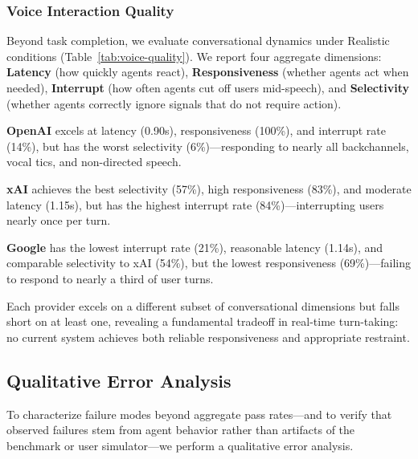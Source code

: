 \subsubsection{Voice Interaction Quality}

Beyond task completion, we evaluate conversational dynamics under Realistic conditions (Table~\ref{tab:voice-quality}). We report four aggregate dimensions: \textbf{Latency} (how quickly agents react), \textbf{Responsiveness} (whether agents act when needed), \textbf{Interrupt} (how often agents cut off users mid-speech), and \textbf{Selectivity} (whether agents correctly ignore signals that do not require action).

\begin{table}[h]
\caption{Voice interaction quality (Realistic condition, aggregated across domains). \textbf{Bold} indicates best. Full breakdown in Appendix~\ref{app:voice-metrics-detail}.}
\label{tab:voice-quality}
\centering
\begin{small}
\resizebox{\columnwidth}{!}{%

}
\end{small}
\end{table}



\textbf{OpenAI} excels at latency (0.90s), responsiveness (100\%), and interrupt rate (14\%), but has the worst selectivity (6\%)---responding to nearly all backchannels, vocal tics, and non-directed speech.

\textbf{xAI} achieves the best selectivity (57\%), high responsiveness (83\%), and moderate latency (1.15s), but has the highest interrupt rate (84\%)---interrupting users nearly once per turn.

\textbf{Google} has the lowest interrupt rate (21\%), reasonable latency (1.14s), and comparable selectivity to xAI (54\%), but the lowest responsiveness (69\%)---failing to respond to nearly a third of user turns.

Each provider excels on a different subset of conversational dimensions but falls short on at least one, revealing a fundamental tradeoff in real-time turn-taking: no current system achieves both reliable responsiveness and appropriate restraint.

\subsection{Qualitative Error Analysis}
\label{sec:analysis}

To characterize failure modes beyond aggregate pass rates---and to verify that observed failures stem from agent behavior rather than artifacts of the benchmark or user simulator---we perform a qualitative error analysis.


